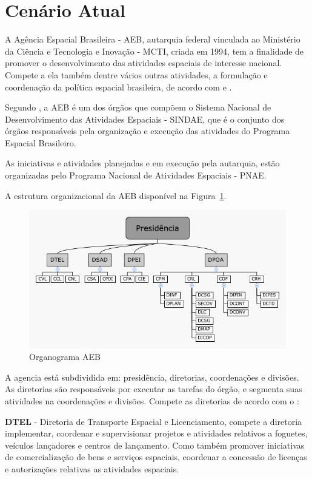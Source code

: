 \section{Cenário Atual}\label{aeb}

A Agência Espacial Brasileira - AEB, autarquia federal vinculada ao Ministério da Ciência e Tecnologia e Inovação - MCTI, criada em 1994, tem a finalidade de promover o desenvolvimento das atividades espaciais de interesse nacional. Compete a ela também dentre vários outras atividades, a formulação e coordenação da política espacial brasileira, de acordo com \cite{Lei:8.854} e \cite{Decreto:4.718}.

Segundo \cite{Decreto:4.718}, a AEB é um dos órgãos que compõem o Sistema Nacional de Desenvolvimento das Atividades Espaciais - SINDAE, que é o conjunto dos órgãos responsáveis pela organização e execução das atividades do Programa Espacial Brasileiro.

As iniciativas e atividades planejadas e em execução pela autarquia, estão organizadas pelo Programa Nacional de Atividades Espaciais - PNAE.

A estrutura organizacional da AEB disponível na Figura~\ref{fig:OrgAeb}.

\begin{figure}[ht]
\centering
\includegraphics[width=.7\textwidth]{OrgAeb.png}
\caption{Organograma AEB}
\label{fig:OrgAeb}
\end{figure}

A agencia está subdividida em: presidência, diretorias, coordenações e divisões. As diretorias são responsáveis por executar as tarefas do órgão, e segmenta suas atividades na coordenações e divisões. Compete as diretorias de acordo com o \cite{Decreto:4.718}:

\textbf{DTEL} - Diretoria de Transporte Espacial e Licenciamento, compete a diretoria implementar, coordenar e supervisionar projetos e atividades relativos a foguetes, veículos lançadores e centros de lançamento. Como também promover iniciativas de comercialização de bens e serviços espaciais, coordenar a concessão de licenças e autorizações relativas as atividades espaciais. 

